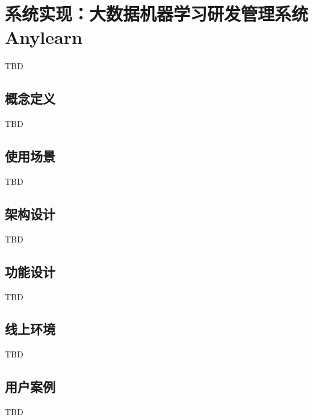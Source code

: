 
\chapter{系统实现：大数据机器学习研发管理系统Anylearn}

TBD


\section{概念定义}

TBD


\section{使用场景}

TBD


\section{架构设计}

TBD


\section{功能设计}

TBD


\section{线上环境}

TBD


\section{用户案例}

TBD
